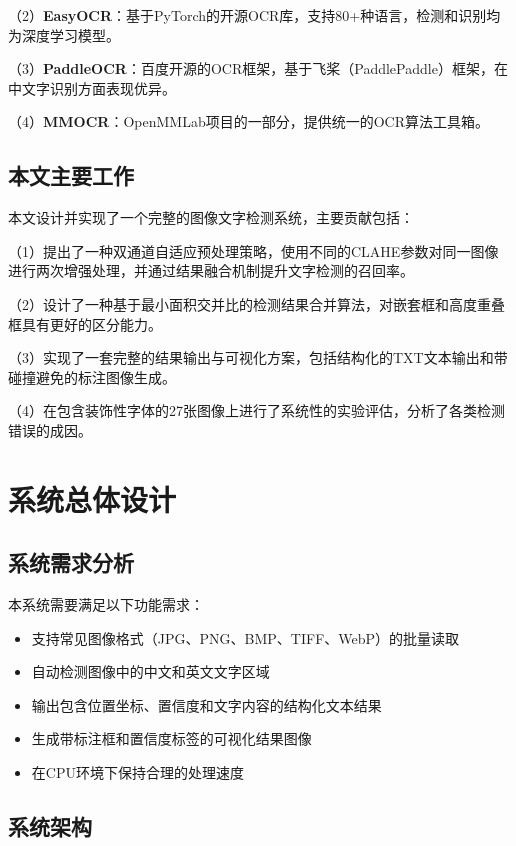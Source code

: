 \documentclass[12pt,hyperref,a4paper,UTF8]{ctexart}
\begin{document}
（2）\textbf{EasyOCR}：基于PyTorch的开源OCR库，支持80+种语言，检测和识别均为深度学习模型。

（3）\textbf{PaddleOCR}：百度开源的OCR框架，基于飞桨（PaddlePaddle）框架，在中文字识别方面表现优异。

（4）\textbf{MMOCR}：OpenMMLab项目的一部分，提供统一的OCR算法工具箱。

\subsection{本文主要工作}

本文设计并实现了一个完整的图像文字检测系统，主要贡献包括：

（1）提出了一种双通道自适应预处理策略，使用不同的CLAHE参数对同一图像进行两次增强处理，并通过结果融合机制提升文字检测的召回率。

（2）设计了一种基于最小面积交并比的检测结果合并算法，对嵌套框和高度重叠框具有更好的区分能力。

（3）实现了一套完整的结果输出与可视化方案，包括结构化的TXT文本输出和带碰撞避免的标注图像生成。

（4）在包含装饰性字体的27张图像上进行了系统性的实验评估，分析了各类检测错误的成因。

\clearpage

\section{系统总体设计}

\subsection{系统需求分析}

本系统需要满足以下功能需求：

\begin{itemize}
    \item 支持常见图像格式（JPG、PNG、BMP、TIFF、WebP）的批量读取
    \item 自动检测图像中的中文和英文文字区域
    \item 输出包含位置坐标、置信度和文字内容的结构化文本结果
    \item 生成带标注框和置信度标签的可视化结果图像
    \item 在CPU环境下保持合理的处理速度
\end{itemize}

\subsection{系统架构}
\end{document}

